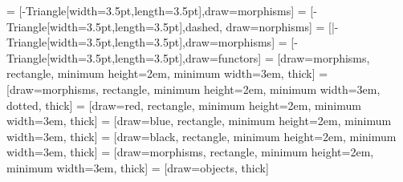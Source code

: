
\usepackage{tikz}


\usetikzlibrary{positioning,
  intersections,
  hobby,
  patterns,
  calc,
  decorations.pathmorphing,
  decorations.markings,
  shadows,
  shapes,
  cd,
  decorations.markings,
  positioning,
  arrows.meta,
  shapes,
  calc,
  fit,
  quotes,
backgrounds}

\usepackage{tikzpagenodes}


 = [-{Triangle[width=3.5pt,length=3.5pt]},draw=morphisms]
 = [-{Triangle[width=3.5pt,length=3.5pt]},dashed, draw=norphisms]
 = [|-{Triangle[width=3.5pt,length=3.5pt]},draw=morphisms]
 = [-{Triangle[width=3.5pt,length=3.5pt]},draw=functors]
 = [draw=morphisms, rectangle, minimum height=2em, minimum width=3em, thick]
 = [draw=morphisms, rectangle, minimum height=2em, minimum width=3em, dotted, thick]
 = [draw=red, rectangle, minimum height=2em, minimum width=3em, thick]
 = [draw=blue, rectangle, minimum height=2em, minimum width=3em, thick]
 = [draw=black, rectangle, minimum height=2em, minimum width=3em, thick]
 = [draw=morphisms, rectangle, minimum height=2em, minimum width=3em, thick]
 = [draw=objects, thick]



\def\preceqSize{10pt}
\newcommand{\hasselinewidth}{2mm}


